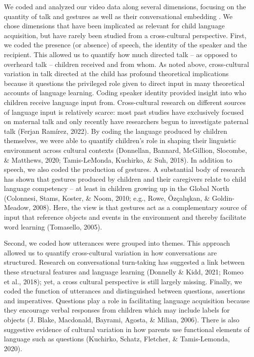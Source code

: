 \documentclass[
  man,floatsintext]{apa6}
\begin{document}
We coded and analyzed our video data along several dimensions, focusing on the quantity of talk and gestures as well as their conversational embedding . We chose dimensions that have been implicated as relevant for child language acquisition, but have rarely been studied from a cross-cultural perspective. First, we coded the presence (or absence) of speech, the identity of the speaker and the recipient. This allowed us to quantify how much directed talk -- as opposed to overheard talk -- children received and from whom. As noted above, cross-cultural variation in talk directed at the child has profound theoretical implications because it questions the privileged role given to direct input in many theoretical accounts of language learning. Coding speaker identity provided insight into who children receive language input from. Cross-cultural research on different sources of language input is relatively scarce: most past studies have exclusively focused on maternal talk and only recently have researchers begun to investigate paternal talk (Ferjan Ramírez, 2022). By coding the language produced by children themselves, we were able to quantify children's role in shaping their linguistic environment across cultural contexts (Donnellan, Bannard, McGillion, Slocombe, \& Matthews, 2020; Tamis-LeMonda, Kuchirko, \& Suh, 2018). In addition to speech, we also coded the production of gestures. A substantial body of research has shown that gestures produced by children and their caregivers relate to child language competency -- at least in children growing up in the Global North (Colonnesi, Stams, Koster, \& Noom, 2010; e.g., Rowe, Özçalışkan, \& Goldin-Meadow, 2008). Here, the view is that gestures act as a complementary source of input that reference objects and events in the environment and thereby facilitate word learning (Tomasello, 2005).

Second, we coded how utterances were grouped into themes. This approach allowed us to quantify cross-cultural variation in how conversations are structured. Research on conversational turn-taking has suggested a link between these structural features and language learning (Donnelly \& Kidd, 2021; Romeo et al., 2018); yet, a cross cultural perspective is still largely missing. Finally, we coded the function of utterances and distinguished between questions, assertions and imperatives. Questions play a role in facilitating language acquisition because they encourage verbal responses from children which may include labels for objects (J. Blake, Macdonald, Bayrami, Agosta, \& Milian, 2006). There is also suggestive evidence of cultural variation in how parents use functional elements of language such as questions (Kuchirko, Schatz, Fletcher, \& Tamis-Lemonda, 2020).
\end{document}
